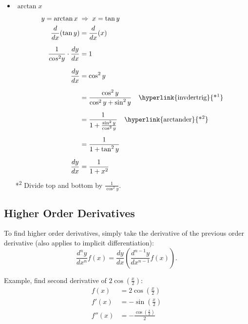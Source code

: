 \documentclass[12pt]{article}
\begin{document}
\begin{itemize}
	\item $\arctan{x}$
	      \begin{align*}
		      y = \arctan{x} \;                      & \Rightarrow \; x = \tan{y}                                                                           \\
		      \frac{d}{dx} (\tan{y})                 & = \frac{d}{dx} (x)                                                                                   \\[6pt]
		      \frac{1}{cos^2{y}} \cdot \frac{dy}{dx} & = 1                                                                                                  \\[6pt]
		      \frac{dy}{dx}                          & = \cos^2{y}                                                                                          \\[6pt]
		      & = \frac{\cos^2{y}}{\cos^2{y} + \sin^2{y}} \quad \text{\hyperlink{invdertrig}{*\textsuperscript{1}}}  \\[6pt]
		      & = \frac{1}{1 + \frac{\sin^2{y}}{\cos^2{y}}} \quad \text{\hyperlink{arctander}{*\textsuperscript{2}}} \\[6pt]
		      & = \frac{1}{1 + \tan^2{y}}                                                                            \\[6pt]
		      \frac{dy}{dx}                          & = \frac{1}{1 + x^2}
	      \end{align*}
	      \hypertarget{arctander}{*\textsuperscript{2} Divide top and bottom by $\frac{1}{\cos^2{y}}$.}
\end{itemize}

\subsection{Higher Order Derivatives}
To find higher order derivatives, simply take the derivative of the previous order derivative (also applies to implicit differentiation):
\[ \frac{d^n y}{dx^n} f(x) = \frac{dy}{dx} \left( \frac{d^{n-1}y}{dx^{n-1}} f(x) \right). \]

\noindent Example, find second derivative of $2\cos \left( \frac{x}{2} \right)$:
\begin{align*}
	f(x)   & = 2\cos \left( \frac{x}{2} \right)           \\[6pt]
	f'(x)  & = -\sin \left( \frac{x}{2} \right)           \\[6pt]
	f''(x) & = -\frac{\cos \left( \frac{x}{2} \right)}{2}
\end{align*}
\end{document}
